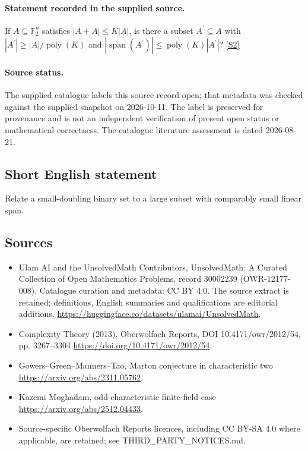 \documentclass[11pt]{article}
\newcommand{\sref}[2]{\hyperlink{source:#1:#2}{[S#2]}}
\begin{document}
\paragraph{Statement recorded in the supplied source.}
If $A\subseteq\mathbb F_2^n$ satisfies $|A+A|\leq K|A|$, is there a subset $A^{\prime}\subseteq A$ with $|A^{\prime}|\geq |A|/\operatorname{poly}(K)$ and $|\operatorname{span}(A^{\prime})|\leq\operatorname{poly}(K)|A^{\prime}|$? \sref{30002239}{2}
\paragraph{Source status.}
The supplied catalogue labels this source record open; that metadata was checked against the supplied snapshot on 2026-10-11. The label is preserved for provenance and is not an independent verification of present open status or mathematical correctness. The catalogue literature assessment is dated 2026-08-21.
\subsection{Short English statement}
Relate a small-doubling binary set to a large subset with comparably small linear span.
\subsection{Sources}
\begin{itemize}
\item[\hypertarget{source:30002239:1}{S1}] Ulam AI and the UnsolvedMath Contributors, UnsolvedMath: A Curated Collection of Open Mathematics Problems, record 30002239 (OWR-12177-008). Catalogue curation and metadata: CC BY 4.0. The source extract is retained; definitions, English summaries and qualifications are editorial additions.
\url{https://huggingface.co/datasets/ulamai/UnsolvedMath}.
\item[\hypertarget{source:30002239:2}{S2}] Complexity Theory (2013), Oberwolfach Reports, DOI 10.4171/owr/2012/54, pp. 3267--3304
\url{https://doi.org/10.4171/owr/2012/54}.
\item[\hypertarget{source:30002239:3}{S3}] Gowers--Green--Manners--Tao, Marton conjecture in characteristic two
\url{https://arxiv.org/abs/2311.05762}.
\item[\hypertarget{source:30002239:4}{S4}] Kazemi Moghadam, odd-characteristic finite-field case
\url{https://arxiv.org/abs/2512.04433}.
\item Source-specific Oberwolfach Reports licences, including CC BY-SA 4.0 where applicable, are retained; see THIRD\_PARTY\_NOTICES.md.
\end{itemize}
\end{document}
